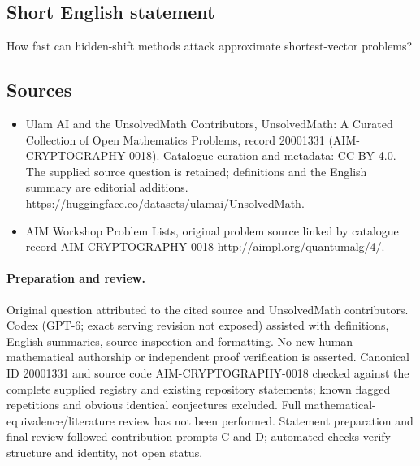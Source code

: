 \documentclass[11pt]{article}
\begin{document}
\subsection{Short English statement}
How fast can hidden-shift methods attack approximate shortest-vector problems?
\subsection{Sources}
\begin{itemize}
\item[\hypertarget{source:20001331:1}{S1}] Ulam AI and the UnsolvedMath Contributors, UnsolvedMath: A Curated Collection of Open Mathematics Problems, record 20001331 (AIM-CRYPTOGRAPHY-0018). Catalogue curation and metadata: CC BY 4.0. The supplied source question is retained; definitions and the English summary are editorial additions.
\url{https://huggingface.co/datasets/ulamai/UnsolvedMath}.
\item[\hypertarget{source:20001331:2}{S2}] AIM Workshop Problem Lists, original problem source linked by catalogue record AIM-CRYPTOGRAPHY-0018
\url{http://aimpl.org/quantumalg/4/}.
\end{itemize}
\paragraph{Preparation and review.}
Original question attributed to the cited source and UnsolvedMath contributors. Codex (GPT-6; exact serving revision not exposed) assisted with definitions, English summaries, source inspection and formatting. No new human mathematical authorship or independent proof verification is asserted. Canonical ID 20001331 and source code AIM-CRYPTOGRAPHY-0018 checked against the complete supplied registry and existing repository statements; known flagged repetitions and obvious identical conjectures excluded. Full mathematical-equivalence/literature review has not been performed. Statement preparation and final review followed contribution prompts C and D; automated checks verify structure and identity, not open status.
\label{end:20001331}
\end{document}

